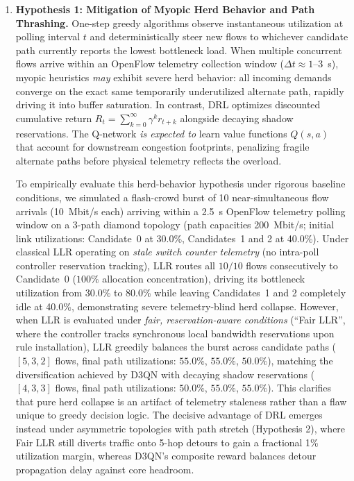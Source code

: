\documentclass[12pt,a4paper,oneside]{report}
\begin{document}
\begin{enumerate}
  \item \textbf{Hypothesis 1: Mitigation of Myopic Herd Behavior and Path Thrashing.} One-step greedy algorithms observe instantaneous utilization at polling interval $t$ and deterministically steer new flows to whichever candidate path currently reports the lowest bottleneck load. When multiple concurrent flows arrive within an OpenFlow telemetry collection window ($\Delta t \approx 1\text{--}3$~s), myopic heuristics \emph{may} exhibit severe herd behavior: all incoming demands converge on the exact same temporarily underutilized alternate path, rapidly driving it into buffer saturation. In contrast, DRL optimizes discounted cumulative return $R_t = \sum_{k=0}^\infty \gamma^k r_{t+k}$ alongside decaying shadow reservations. The Q-network \emph{is expected to} learn value functions $Q(s, a)$ that account for downstream congestion footprints, penalizing fragile alternate paths before physical telemetry reflects the overload.
  
  To empirically evaluate this herd-behavior hypothesis under rigorous baseline conditions, we simulated a flash-crowd burst of 10 near-simultaneous flow arrivals (10~Mbit/s each) arriving within a 2.5~s OpenFlow telemetry polling window on a 3-path diamond topology (path capacities 200~Mbit/s; initial link utilizations: Candidate~0 at 30.0\%, Candidates~1 and 2 at 40.0\%). Under classical LLR operating on \emph{stale switch counter telemetry} (no intra-poll controller reservation tracking), LLR routes all $10/10$ flows consecutively to Candidate~0 ($100\%$ allocation concentration), driving its bottleneck utilization from 30.0\% to 80.0\% while leaving Candidates~1 and 2 completely idle at 40.0\%, demonstrating severe telemetry-blind herd collapse. However, when LLR is evaluated under \emph{fair, reservation-aware conditions} (``Fair LLR'', where the controller tracks synchronous local bandwidth reservations upon rule installation), LLR greedily balances the burst across candidate paths ($[5, 3, 2]$ flows, final path utilizations: $55.0\%$, $55.0\%$, $50.0\%$), matching the diversification achieved by D3QN with decaying shadow reservations ($[4, 3, 3]$ flows, final path utilizations: $50.0\%$, $55.0\%$, $55.0\%$). This clarifies that pure herd collapse is an artifact of telemetry staleness rather than a flaw unique to greedy decision logic. The decisive advantage of DRL emerges instead under asymmetric topologies with path stretch (Hypothesis 2), where Fair LLR still diverts traffic onto 5-hop detours to gain a fractional 1\% utilization margin, whereas D3QN's composite reward balances detour propagation delay against core headroom.


\end{enumerate}
\end{document}
